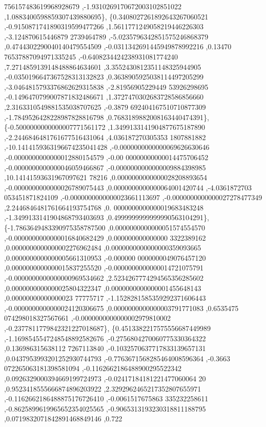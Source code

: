 \begin{DoxyCode}
      756157483619968928679 ,-1.9310269170672003102851022 ,1.0883400598859307439880695\},
\{0.3408027261892643267060521 ,-0.9150871741890319599477266 ,1.5611771249058219446226303 ,-3.124870615446879
      2739464789 ,-5.0235796342851575246868379 ,0.4744302290040140479554509 ,-0.0311342691445949878992216 ,0.13470
      76537887094971335245 ,-0.6408234424238931081774240 ,7.2714859139148488864634601 ,3.3552430812351148325944905
       ,-0.0350196647367528313132823 ,0.3638905925038114497205299 ,-3.0464815793376862629315838 ,-2.81956905229449
      53926298695 ,-0.1496470799007871832486671 ,1.3727470302683728586856660 ,2.3163310549881535038707625 ,-0.3879
      692404167510710877309 ,-1.7849526428228987828816798 ,0.7683189882008163440474391\},
\{-0.5000000000000007771561172 ,1.3499133141904877675187890 ,-2.2446846481761677516431064 ,4.036187270305353
      1807881882 ,-10.1414159363196674235041428 ,-0.0000000000000069626630646 ,-0.0000000000000012880154579 ,-0.00
      00000000000014475706452 ,-0.0000000000000046059466867 ,-0.0000000000000009884398985 ,10.14141593631967097621
      78216 ,0.0000000000000028208893654 ,-0.0000000000000026789075443 ,0.0000000000000064001420744 ,-4.0361872703
      053451871824109 ,-0.0000000000000023661113697 ,-0.0000000000000027278477349 ,2.2446846481761664193754768 ,0.
      0000000000000019683483248 ,-1.3499133141904868793403693 ,0.4999999999999990563104291\},
\{-1.7863649483390975358787500 ,0.0000000000000051574554570 ,-0.0000000000000016840682429 ,0.000000000000000
      3322389162 ,0.0000000000000002276962484 ,0.0000000000000000359093665 ,0.0000000000000005661310953 ,-0.000000
      0000000049076457120 ,0.0000000000000015837255520 ,-0.0000000000000014721075791 ,-0.0000000000000000969534662
       ,2.5234267774294565356285602 ,0.0000000000000025804322347 ,0.0000000000000001455648143 ,0.00000000000000023
      77775717 ,-1.1528281585359292371606443 ,-0.0000000000000024120306675 ,0.0000000000000003791771083 ,0.6535475
      074298018327567661 ,-0.0000000000000002979810002 ,-0.2377811779842321227018687\},
\{0.4513382217575556687449989 ,-1.1698545547248548892582676 ,-0.2756804270060775330364322 ,0.136986315638112
      7267113840 ,-0.1032570637717833139657131 ,0.0437953993201252930744793 ,-0.7763671568285464008596364 ,-0.3663
      072265063181398581094 ,-0.1162662186488900295522342 ,0.0926329000394669199724973 ,-0.02417184181221477060064
      20 ,0.9523418555666874896203922 ,2.3292962465217352807655971 ,-0.1162662186488875176726410 ,-0.0061517675863
      335232258611 ,-0.8625899619965652354025565 ,-0.9065313193230318811188795 ,0.0719832071842891468849146 ,0.722

\end{DoxyCode}
